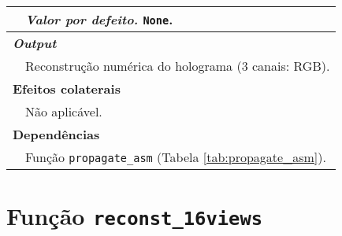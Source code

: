 \begin{table}[!hp]
\begin{tabular}{p{1cm} p{11.5cm}}
         & \hspace{1cm} \textit{Valor por defeito.} \verb|None|.\\
        \hline\multicolumn{2}{l}{\bfseries\small \textit{Output}}\\
         & Reconstrução numérica do holograma (3 canais: \ac{RGB}).\\
        \hline\multicolumn{2}{l}{\bfseries\small Efeitos colaterais}\\
         & Não aplicável. \\
        \hline\multicolumn{2}{l}{\bfseries\small Dependências}\\
         & Função \verb|propagate_asm| (Tabela \ref{tab:propagate_asm}). \\
        \hline
    \end{tabular}
\end{table}



\newpage
\section{Função \texttt{reconst\_16views}}
\label{sec::doc-codigo:reconst_16views}

